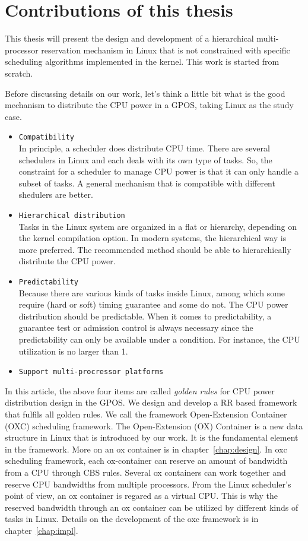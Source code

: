 \section{Contributions of this thesis}

This thesis will present the design and development of a hierarchical 
multi-processor reservation mechanism in Linux that is not constrained 
with specific scheduling algorithms implemented in the kernel.
This work is started from scratch.

%
Before discussing details on our work, let's think a little bit what
is the good mechanism to distribute the CPU power in a GPOS, taking 
Linux as the study case. 
\begin{itemize}

\item   {\texttt{Compatibility}}\\
	In principle, a scheduler does distribute CPU time. There are 
	several schedulers in Linux and each deals with its own type 
	of tasks. So, the constraint for a scheduler to manage CPU 
	power is that it can only handle a subset of tasks. A general 
	mechanism that is compatible with different shedulers are better.  
\item 	{\texttt{Hierarchical distribution}}\\
	Tasks in the Linux system are organized in a flat or hierarchy, 
	depending on the kernel compilation option. In modern systems, the 
	hierarchical way is more preferred. The recommended method should 
	be able to hierarchically distribute the CPU power.
\item 	{\texttt{Predictability}}\\
	Because there are various kinds of tasks inside Linux, among which
	some require (hard or soft) timing guarantee and some do not. 
	The CPU power distribution should be predictable. When it comes to 
	predictability, a guarantee test or admission control is always 
	necessary since the predictability can only be available under 
	a condition. For instance, the CPU utilization is no larger than 1. 
\item	{\texttt{Support multi-procressor platforms}}
\end{itemize}
In this article, the above four items are called \emph{golden rules} 
for CPU power distribution design in the GPOS. We design and develop 
a RR based framework that fulfils all golden rules. 
We call the framework Open-Extension Container (OXC) scheduling
framework. The Open-Extension (OX) Container is a new data structure in
Linux that is introduced by our work.  It is the fundamental element
in the framework. More on an ox container is in chapter~\ref{chap:design}. 
In oxc scheduling framework, each ox-container can reserve an amount of 
bandwidth from a CPU through CBS rules. Several ox containers can work
together and reserve CPU bandwidths from multiple processors. From the 
Linux scheduler's point of view, an ox container is regared as a virtual 
CPU. This is why the reserved bandwidth through an ox container can be 
utilized by different kinds of tasks in Linux. Details on the development 
of the oxc framework is in chapter~\ref{chap:impl}.


